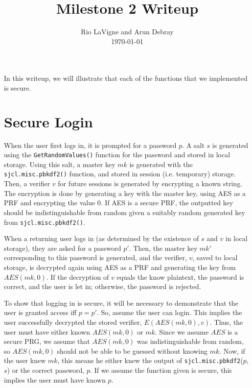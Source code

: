 \documentclass{amsart}
\begin{document}
\title{Milestone 2 Writeup}
\author{Rio LaVigne and Arun Debray\\\today}
\maketitle
In this writeup, we will illustrate that each of the functions that we implemented is secure.
\section{Secure Login}%
When the user first logs in, it is prompted for a password $p$. A salt $s$ is generated using the \verb+GetRandomValues()+ function for the password and stored in local storage. Using this salt, a master key $mk$ is generated with the \verb+sjcl.misc.pbkdf2()+ function, and stored in session (i.e. temporary) storage. Then, a verifier $v$ for future sessions is generated by encrypting a known string. The encryption is done by generating a key with the master key, using AES as a PRF and encrypting the value 0. If AES is a secure PRF, the outputted key should be indistinguishable from random given a suitably random generated key from  \verb+sjcl.misc.pbkdf2()+.

When a returning user logs in (as determined by the existence of $s$ and $v$ in local storage), they are asked for a password $p'$. Then, the master key $mk'$ corresponding to this password is generated, and the verifier, $v$, saved to local storage, is decrypted again using AES as a PRF and generating the key from $AES(mk, 0)$. If the decryption of $v$ equals the know plaintext, the password is correct, and the user is let in; otherwise, the password is rejected.

To show that logging in is secure, it will be necessary to demonstrate that the user is granted access iff $p = p'$. So, assume the user can login. This implies the user successfully decrypted the stored verifier, $E(AES(mk, 0), v)$. Thus, the user must have either known $AES(mk, 0)$ or $mk$. Since we assume $AES$ is a secure PRG, we assume that $AES(mk, 0)$ was indistinguishable from random, so $AES(mk, 0)$ should not be able to be guessed without knowing $mk$. Now, if the user knew $mk$, this means he either knew the output of \verb+sjcl.misc.pbkdf2+($p$, $s$) or the correct password, $p$. If we assume the function given is secure, this implies the user must have known $p$. %

\end{document}

